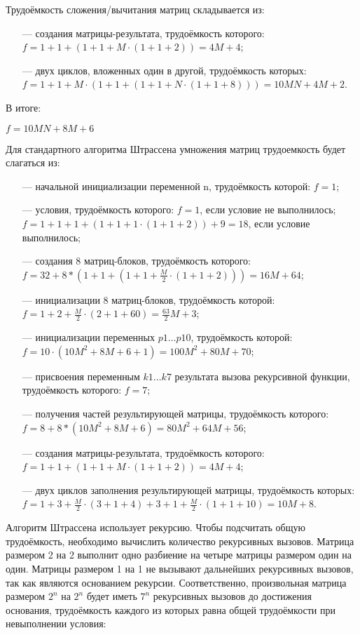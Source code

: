 Трудоёмкость сложения/вычитания матриц складывается из:
\begin{itemize}
	\item[---] создания матрицы-результата, трудоёмкость которого: $f = 1 + 1 + (1 + 1 + M \cdot (1 + 1 + 2)) = 4M+4$;
	\item[---] двух циклов, вложенных один в другой, трудоёмкость которых: $f = 1 + 1 + M \cdot (1 + 1 + (1 + 1 + N \cdot (1 + 1 + 8))) = 10MN + 4M + 2$.
\end{itemize}

В итоге:

$f = 10MN + 8M + 6$

Для стандартного алгоритма Штрассена умножения матриц трудоемкость будет слагаться из:

\begin{itemize}
	\item[---] начальной инициализации переменной n, трудоёмкость которой: $f = 1$;
	\item[---] условия, трудоёмкость которого: $f = 1$, если условие не выполнилось; $f = 1 + 1 + 1 + (1 + 1 + 1 \cdot (1 + 1 + 2)) + 9 = 18$, если условие выполнилось;
	\item[---] создания 8 матриц-блоков, трудоёмкость которого: $f = 32 + 8 * (1 + 1 + (1 + 1 + \frac{M}{2} \cdot (1 + 1 + 2))) = 16M+64$;
	\item[---] инициализации 8 матриц-блоков, трудоёмкость которой: $f = 1 + 2 + \frac{M}{2} \cdot (2 + 1 + 60) = \frac{63}{2}M + 3$;  
	\item[---] инициализации переменных $p1 \ldots p10$, трудоёмкость которой: $f = 10 \cdot (10M^2 + 8M + 6 + 1) = 100M^2 + 80M + 70$;
	\item[---] присвоения переменным $k1 \ldots k7$ результата вызова рекурсивной функции, трудоёмкость которого: $f = 7$;
	\item[---] получения частей результирующей матрицы, трудоёмкость которого: $f = 8 + 8 * (10M^2 + 8M + 6) = 80M^2 + 64M + 56$;
	\item[---] создания матрицы-результата, трудоёмкость которого: $f = 1 + 1 + (1 + 1 + M \cdot (1 + 1 + 2)) = 4M+4$;
	\item[---] двух циклов заполнения результирующей матрицы, трудоёмкость которых: $f = 1 + 3 + \frac{M}{2} \cdot (3 + 1 + 4) + 3 + 1 + \frac{M}{2} \cdot (1 + 1 + 10) = 10M + 8$.
	
\end{itemize}

Алгоритм Штрассена использует рекурсию. Чтобы подсчитать общую трудоёмкость, необходимо вычислить количество рекурсивных вызовов. Матрица размером 2 на 2 выполнит одно разбиение на четыре матрицы размером один на один. Матрицы размером 1 на 1 не вызывают дальнейших рекурсивных вызовов, так как являются основанием рекурсии. Соответственно, произвольная матрица размером $2^n$ на $2^n$ будет иметь $7^n$ рекурсивных вызовов до достижения основания, трудоёмкость каждого из которых равна общей трудоёмкости при невыполнении условия:


